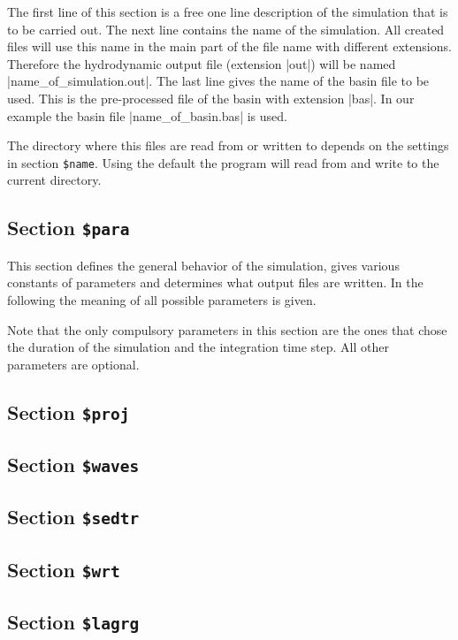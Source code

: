 \documentclass{report}
\begin{document}
The first line of this section is a free one line description of
the simulation that is to be carried out. The next line contains
the name of the simulation.
All created files will use this name in the main part of the file name
with different extensions. Therefore the hydrodynamic output file
(extension |out|) will be named |name_of_simulation.out|.
The last line gives the name of the basin file to be used. This
is the pre-processed file of the basin with extension |bas|.
In our example the basin file |name_of_basin.bas| is used.

The directory where this files are read from or written to depends
on the settings in section {\tt \$name}. Using the default
the program will read from and write to the current directory.

\subsection{Section {\tt \$para}}

This section defines the general behavior of the simulation,
gives various constants of parameters and determines what
output files are written. In the following the meaning of
all possible parameters is given.

Note that the only compulsory parameters in this section are 
the ones that chose the duration of the simulation and the
integration time step. All other parameters are optional.



\subsection{Section {\tt \$proj}}


\subsection{Section {\tt \$waves}}


\subsection{Section {\tt \$sedtr}}


\subsection{Section {\tt \$wrt}}


\subsection{Section {\tt \$lagrg}}

\end{document}
